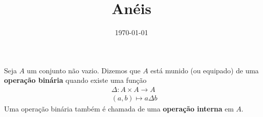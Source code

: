 \documentclass{beamer}
\title{Anéis}
\author[\autor]{\autor}
\institute[\instituto]{\instituto}
\date{\today}
\begin{document}
    \begin{frame}
        \maketitle
    \end{frame}

    
    \begin{frame}
        \begin{definicao}
            Seja $A$ um conjunto n{\~a}o vazio. Dizemos que $A$ est{\'a} munido (ou equipado) de uma \textbf{opera{\c c}{\~a}o bin{\'a}ria} quando existe uma fun{\c c}{\~a}o
            \begin{align*}
                &\Delta : A \times A \to A\\
                &(a,b) \longmapsto a\Delta b        
            \end{align*}
            Uma opera{\c c}{\~a}o bin{\'a}ria tamb{\'e}m {\'e} chamada de uma \textbf{opera{\c c}{\~a}o interna} em $A$.
        \end{definicao}
    \end{frame}
\end{document}
